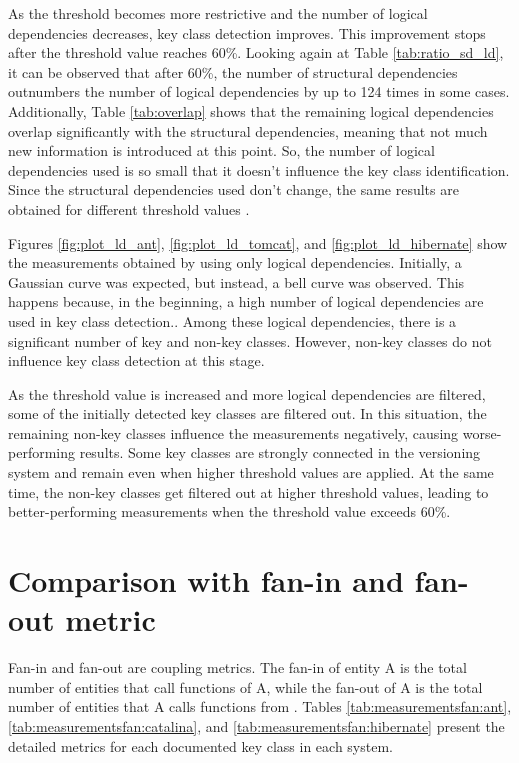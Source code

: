 As the threshold becomes more restrictive and the number of logical dependencies decreases, key class detection improves. This improvement stops after the threshold value reaches 60\%. Looking again at Table \ref{tab:ratio_sd_ld}, it can be observed that after 60\%, the number of structural dependencies outnumbers the number of logical dependencies by up to 124 times in some cases. Additionally, Table \ref{tab:overlap} shows that the remaining logical dependencies overlap significantly with the structural dependencies, meaning that not much new information is introduced at this point.
 So, the number of logical dependencies used is so small that it doesn't influence the key class identification. Since the structural dependencies used don't change, the same results are obtained for different threshold values \hspace{4em}.



Figures \ref{fig:plot_ld_ant}, \ref{fig:plot_ld_tomcat}, and \ref{fig:plot_ld_hibernate} show the measurements obtained by using only logical dependencies. Initially, a Gaussian curve was expected, but instead, a bell curve was observed. This happens because, in the beginning, a high number of logical dependencies are used in key class detection.. Among these logical dependencies, there is a significant number of key and non-key classes. However, non-key classes do not influence key class detection at this stage.

As the threshold value is increased and more logical dependencies are filtered, some of the initially detected key classes are filtered out. In this situation, the remaining non-key classes influence the measurements negatively, causing worse-performing results. Some key classes are strongly connected in the versioning system and remain even when higher threshold values are applied. At the same time, the non-key classes get filtered out at higher threshold values, leading to better-performing measurements when the threshold value exceeds 60\%.




\section{Comparison with fan-in and fan-out metric}
\label{sec:key_metrics}


\hspace{4em}Fan-in and fan-out are coupling metrics. The fan-in of entity A is the total number of entities that call functions of A, while the fan-out of A is the total number of entities that A calls functions from \cite{5507329}. Tables \ref{tab:measurementsfan:ant}, \ref{tab:measurementsfan:catalina}, and \ref{tab:measurementsfan:hibernate} present the detailed metrics for each documented key class in each system. 

